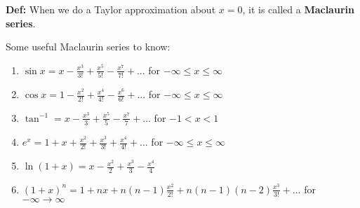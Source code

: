 \documentclass{article}
\begin{document}
\textbf{Def:} When we do a Taylor approximation about $x=0$, it is called a \textbf{Maclaurin series}.  

Some useful Maclaurin series to know:

\begin{enumerate}
    \item $\sin x = x-\frac{x^3}{3!} + \frac{x^5}{5!} - \frac{x^7}{7!} + ...$ for $-\infty \leq x \leq \infty$
    \item $\cos x = 1-\frac{x^2}{2!} + \frac{x^4}{4!} - \frac{x^6}{6!} + ...$ for $-\infty \leq x \leq \infty$
    \item $\tan ^{-1} = x-\frac{x^3}{3} + \frac{x^5}{5} - \frac{x^7}{7} + ...$ for $ -1 < x < 1$
    \item $e^x = 1 + x + \frac{x^2}{2!} + \frac{x^3}{3!} + \frac{x^4}{4!} + ...$ for $-\infty \leq x \leq \infty$
    \item $\ln(1+x) = x - \frac{x^2}{2} + \frac{x^3}{3} - \frac{x^4}{4}$
    \item $(1+x)^n = 1 +nx + n(n-1)\frac{x^2}{2!} + n(n-1)(n-2)\frac{x^3}{3!} + ...$ for $-\infty \to \infty$
\end{enumerate}
\end{document}
